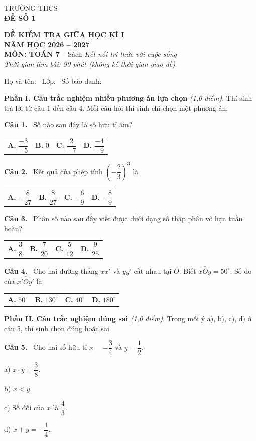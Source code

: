 \documentclass[12pt,a4paper]{article}
\makeatletter
\newcommand{\bonpa}[4]{\par\noindent\begin{tabularx}{\linewidth}{@{\hspace{0.6cm}}XXXX@{}}
\textbf{A.} #1 & \textbf{B.} #2 & \textbf{C.} #3 & \textbf{D.} #4\end{tabularx}\par}
\newcommand{\cau}[1]{\par\medskip\textbf{Câu #1.}~}
\newcommand{\y}[1]{\par\hspace*{0.6cm}#1}
\newcommand{\phan}[1]{\par\bigskip{\large\textbf{#1}}\par\smallskip}
\makeatother
\begin{document}
\newpage
\noindent
\begin{minipage}[t]{0.38\linewidth}\centering
TRƯỜNG THCS \dotfill\\[2pt]
\textbf{ĐỀ SỐ 1}
\end{minipage}\hfill
\begin{minipage}[t]{0.6\linewidth}\centering
\textbf{ĐỀ KIỂM TRA GIỮA HỌC KÌ I}\\
\textbf{NĂM HỌC 2026 -- 2027}\\
\textbf{MÔN: TOÁN 7} -- Sách \textit{Kết nối tri thức với cuộc sống}\\
\textit{Thời gian làm bài: 90 phút (không kể thời gian giao đề)}
\end{minipage}

\medskip
Họ và tên: \dotfill\ Lớp: \makebox[2cm]{\dotfill}\ Số báo danh: \makebox[2.5cm]{\dotfill}
\phan{A. TRẮC NGHIỆM (3,0 điểm)}
\textbf{Phần I. Câu trắc nghiệm nhiều phương án lựa chọn} \textit{(1,0 điểm)}. Thí sinh trả lời từ câu 1 đến câu 4. Mỗi câu hỏi thí sinh chỉ chọn một phương án.
\cau{1} Số nào sau đây là số hữu tỉ âm?
\bonpa{$\dfrac{-3}{-5}$}{$0$}{$\dfrac{2}{-7}$}{$\dfrac{-4}{-9}$}
\cau{2} Kết quả của phép tính $\left(-\dfrac{2}{3}\right)^{3}$ là
\bonpa{$-\dfrac{8}{27}$}{$\dfrac{8}{27}$}{$-\dfrac{6}{9}$}{$-\dfrac{8}{9}$}
\cau{3} Phân số nào sau đây viết được dưới dạng số thập phân vô hạn tuần hoàn?
\bonpa{$\dfrac{3}{8}$}{$\dfrac{7}{20}$}{$\dfrac{5}{12}$}{$\dfrac{9}{25}$}
\cau{4} Cho hai đường thẳng $xx'$ và $yy'$ cắt nhau tại $O$. Biết $\widehat{xOy}=50^\circ$. Số đo của $\widehat{x'Oy'}$ là
\bonpa{$50^\circ$}{$130^\circ$}{$40^\circ$}{$180^\circ$}

\medskip\textbf{Phần II. Câu trắc nghiệm đúng sai} \textit{(1,0 điểm)}. Trong mỗi ý a), b), c), d) ở câu 5, thí sinh chọn đúng hoặc sai.
\cau{5} Cho hai số hữu tỉ $x=-\dfrac{3}{4}$ và $y=\dfrac{1}{2}$.
\y{a) $x\cdot y=\dfrac{3}{8}$.}
\y{b) $x<y$.}
\y{c) Số đối của $x$ là $\dfrac{4}{3}$.}
\y{d) $x+y=-\dfrac{1}{4}$.}
\end{document}
